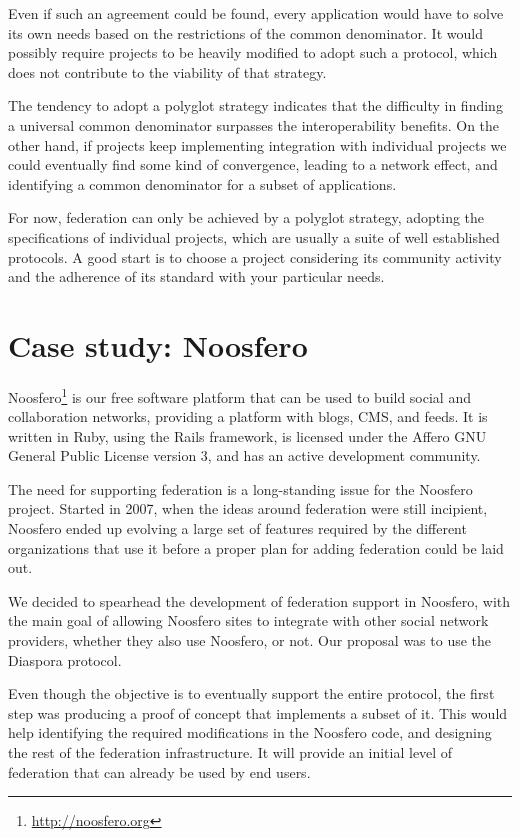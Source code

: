 Even if such an agreement could be found, every application would have to solve
its own needs based on the restrictions of the common denominator. It would
possibly require projects to be heavily modified to adopt such a protocol,
which does not contribute to the viability of that strategy.

The tendency to adopt a polyglot strategy indicates that the difficulty
in finding a universal common denominator surpasses the interoperability
benefits. On the other hand, if projects keep implementing integration
with individual projects we could eventually find some kind of
convergence, leading to a network effect, and identifying a common
denominator for a subset of applications.

For now, federation can only be achieved by a polyglot strategy, adopting
the specifications of individual projects, which are usually a suite of
well established protocols. A good start is to choose a project
considering its community activity and the adherence of its standard
with your particular needs.

\section{Case study: Noosfero}

Noosfero\footnote{\url{http://noosfero.org}} is our free software
platform that can be used to build social and collaboration networks,
providing a platform with blogs, CMS, and feeds. It is written in Ruby,
using the Rails framework, is licensed under the Affero GNU General
Public License version 3, and has an active development community.

The need for supporting federation is a long-standing issue for the
Noosfero project. Started in 2007, when the ideas around federation were
still incipient, Noosfero ended up evolving a large set of features
required by the different organizations that use it before a proper
plan for adding federation could be laid out.

We decided to spearhead the development of federation support in
Noosfero, with the main goal of allowing Noosfero sites to integrate with
other social network providers, whether they also use Noosfero, or
not. Our proposal was to use the Diaspora protocol.

Even though the objective is to eventually support the entire protocol,
the first step was producing a proof of concept that implements a subset
of it. This would help identifying the required modifications in the
Noosfero code, and designing the rest of the federation infrastructure.
It will provide an initial level of federation that can already be
used by end users.

